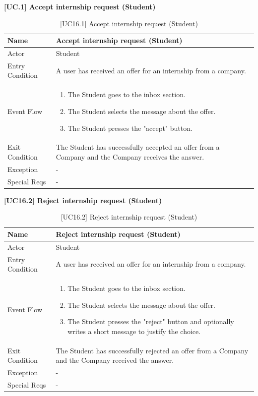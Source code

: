 \textbf{[UC\nextUseCases.1] Accept internship request (Student)}
\begin{table}[H] %
    \centering
    \begin{tabular}{|p{3cm}|p{10cm}|}
    \hline
    Name & Accept internship request (Student) \\ \hline
    Actor  & Student \\ \hline
    Entry Condition  & A user has received an offer for an internship from a company.  \\ \hline
    Event Flow  & 
    \begin{enumerate}[noitemsep, topsep=0pt]
        \item The Student goes to the inbox section.
        \item The Student selects the message about the offer.
        \item The Student presses the "accept" button.
    \end{enumerate}
    \\ \hline
    Exit Condition  & The Student has successfully accepted an offer from a Company and the Company receives the answer. \\ \hline
    Exception  & - \\ \hline
    Special Reqs  & - \\ \hline
    \end{tabular}
    \caption{[UC16.1] Accept internship request (Student)}
\end{table}

\textbf{[UC16.2] Reject internship request (Student)}
\begin{table}[H] %
    \centering
    \begin{tabular}{|p{3cm}|p{10cm}|}
    \hline
    Name & Reject internship request (Student) \\ \hline
    Actor  & Student \\ \hline
    Entry Condition  & A user has received an offer for an internship from a company.  \\ \hline
    Event Flow  & 
    \begin{enumerate}[noitemsep, topsep=0pt]
        \item The Student goes to the inbox section.
        \item The Student selects the message about the offer.
        \item The Student presses the "reject" button and optionally writes a short message to justify the choice.
    \end{enumerate}
    \\ \hline
    Exit Condition  & The Student has successfully rejected an offer from a Company and the Company received the answer. \\ \hline
    Exception  & - \\ \hline
    Special Reqs  & - \\ \hline
    \end{tabular}
    \caption{[UC16.2] Reject internship request (Student)}
\end{table}

